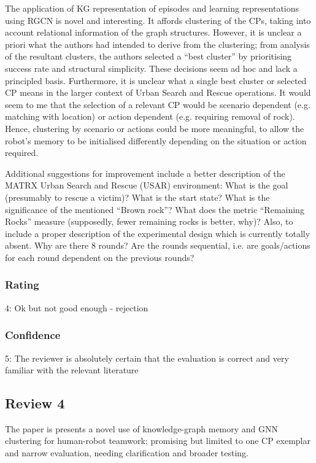 \documentclass[letterpaper]{article} %
\begin{document}
The application of KG representation of episodes and learning representations using RGCN is novel and interesting.  It affords clustering of the CPs, taking into account relational information of the graph structures.  However, it is unclear a priori what the authors had intended to derive from the clustering; from analysis of the resultant clusters, the authors selected a ``best cluster'' by prioritising success rate and structural simplicity.  These decisions seem ad hoc and lack a principled basis.  Furthermore, it is unclear what a single best cluster or selected CP means in the larger context of Urban Search and Rescue operations.  It would seem to me that the selection of a relevant CP would be scenario dependent (e.g. matching with location) or action dependent (e.g. requiring removal of rock).  Hence, clustering by scenario or actions could be more meaningful, to allow the robot's memory to be initialised differently depending on the situation or action required.

Additional suggestions for improvement include a better description of the MATRX Urban Search and Rescue (USAR) environment: What is the goal (presumably to rescue a victim)? What is the start state? What is the significance of the mentioned ``Brown rock''?  What does the metric ``Remaining Rocks'' measure (supposedly, fewer remaining rocks is better, why)?  Also, to include a proper description of the experimental design which is currently totally absent.  Why are there 8 rounds?  Are the rounds sequential, i.e. are goals/actions for each round dependent on the previous rounds?

\subsubsection*{Rating}
4: Ok but not good enough - rejection

\subsubsection*{Confidence}
5: The reviewer is absolutely certain that the evaluation is correct and very familiar with the relevant literature


\subsection{Review 4}
The paper is presents a novel use of knowledge-graph memory and GNN clustering for human-robot teamwork; promising but limited to one CP exemplar and narrow evaluation, needing clarification and broader testing.
\end{document}
